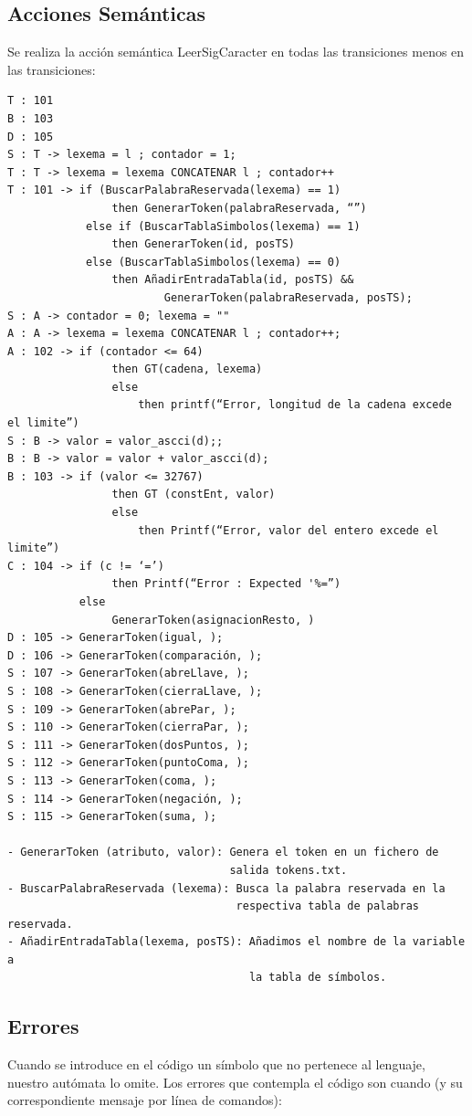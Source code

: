 \documentclass{article}[a4paper]
\begin{document}
\subsection{Acciones Semánticas}
Se realiza la acción semántica LeerSigCaracter en todas las transiciones 
menos en las transiciones:
\begin{verbatim}
T : 101
B : 103
D : 105
S : T -> lexema = l ; contador = 1;
T : T -> lexema = lexema CONCATENAR l ; contador++
T : 101 -> if (BuscarPalabraReservada(lexema) == 1) 
                then GenerarToken(palabraReservada, “”)
            else if (BuscarTablaSimbolos(lexema) == 1) 
                then GenerarToken(id, posTS)
            else (BuscarTablaSimbolos(lexema) == 0) 
                then AñadirEntradaTabla(id, posTS) &&
                        GenerarToken(palabraReservada, posTS);
S : A -> contador = 0; lexema = ""
A : A -> lexema = lexema CONCATENAR l ; contador++;
A : 102 -> if (contador <= 64) 
                then GT(cadena, lexema)
	            else 
	                then printf(“Error, longitud de la cadena excede el limite”)
S : B -> valor = valor_ascci(d);;
B : B -> valor = valor + valor_ascci(d);
B : 103 -> if (valor <= 32767) 
                then GT (constEnt, valor)
	            else
	                then Printf(“Error, valor del entero excede el limite”)
C : 104 -> if (c != ‘=’)
                then Printf(“Error : Expected '%=”)
           else 
                GenerarToken(asignacionResto, )
D : 105 -> GenerarToken(igual, );
D : 106 -> GenerarToken(comparación, );
S : 107 -> GenerarToken(abreLlave, );
S : 108 -> GenerarToken(cierraLlave, );
S : 109 -> GenerarToken(abrePar, );
S : 110 -> GenerarToken(cierraPar, );
S : 111 -> GenerarToken(dosPuntos, );
S : 112 -> GenerarToken(puntoComa, );
S : 113 -> GenerarToken(coma, );
S : 114 -> GenerarToken(negación, );
S : 115 -> GenerarToken(suma, );

- GenerarToken (atributo, valor): Genera el token en un fichero de 
                                  salida tokens.txt.
- BuscarPalabraReservada (lexema): Busca la palabra reservada en la 
                                   respectiva tabla de palabras reservada.
- AñadirEntradaTabla(lexema, posTS): Añadimos el nombre de la variable a 
                                     la tabla de símbolos.

\end{verbatim}

\subsection{Errores}
Cuando se introduce en el código un símbolo que no pertenece al lenguaje, nuestro autómata lo omite. Los errores que contempla el código son cuando (y su correspondiente mensaje por línea de comandos):\\
\end{document}
